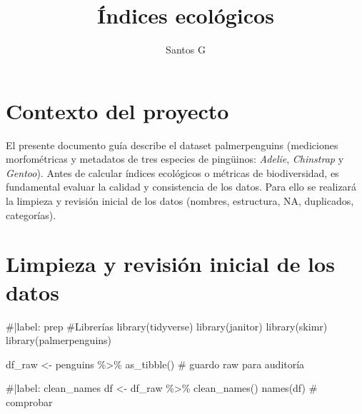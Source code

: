 \documentclass[
  spanish,
  11pt,
  a4paper,
  DIV=11,
  numbers=noendperiod]{scrartcl}
\title{Índices ecológicos}
\author{Santos G}
\date{}
\newenvironment{Shaded}{\begin{snugshade}}{\end{snugshade}}
\newcommand{\CommentTok}[1]{\textcolor[rgb]{0.37,0.37,0.37}{#1}}
\newcommand{\FunctionTok}[1]{\textcolor[rgb]{0.28,0.35,0.67}{#1}}
\newcommand{\NormalTok}[1]{\textcolor[rgb]{0.00,0.23,0.31}{#1}}
\newcommand{\OtherTok}[1]{\textcolor[rgb]{0.00,0.23,0.31}{#1}}
\newcommand{\SpecialCharTok}[1]{\textcolor[rgb]{0.37,0.37,0.37}{#1}}
\renewcommand*\contentsname{Tabla de contenidos}
\newcommand\contentsname{Tabla de contenidos}
\begin{document}
\maketitle

\renewcommand*\contentsname{Tabla de contenidos}
{
\hypersetup{linkcolor=}
\setcounter{tocdepth}{2}
\tableofcontents
}

\section{Contexto del proyecto}\label{contexto-del-proyecto}

El presente documento guía describe el dataset palmerpenguins
(mediciones morfométricas y metadatos de tres especies de pingüinos:
\emph{Adelie}, \emph{Chinstrap} y \emph{Gentoo}). Antes de calcular
índices ecológicos o métricas de biodiversidad, es fundamental evaluar
la calidad y consistencia de los datos. Para ello se realizará la
limpieza y revisión inicial de los datos (nombres, estructura, NA,
duplicados, categorías).

\section{Limpieza y revisión inicial de los
datos}\label{limpieza-y-revisiuxf3n-inicial-de-los-datos}

\begin{Shaded}
\begin{Highlighting}[numbers=left,,]
\CommentTok{\#|label: prep}
\CommentTok{\#Librerías}
\FunctionTok{library}\NormalTok{(tidyverse)}
\FunctionTok{library}\NormalTok{(janitor)}
\FunctionTok{library}\NormalTok{(skimr)}
\FunctionTok{library}\NormalTok{(palmerpenguins)}

\NormalTok{df\_raw }\OtherTok{\textless{}{-}}\NormalTok{ penguins }\SpecialCharTok{\%\textgreater{}\%} \FunctionTok{as\_tibble}\NormalTok{() }\CommentTok{\# guardo raw para auditoría}
\end{Highlighting}
\end{Shaded}

\begin{Shaded}
\begin{Highlighting}[numbers=left,,]
\CommentTok{\#|label: clean\_names}
\NormalTok{df }\OtherTok{\textless{}{-}}\NormalTok{ df\_raw }\SpecialCharTok{\%\textgreater{}\%} \FunctionTok{clean\_names}\NormalTok{()}
\FunctionTok{names}\NormalTok{(df) }\CommentTok{\# comprobar}
\end{Highlighting}
\end{Shaded}
\end{document}
